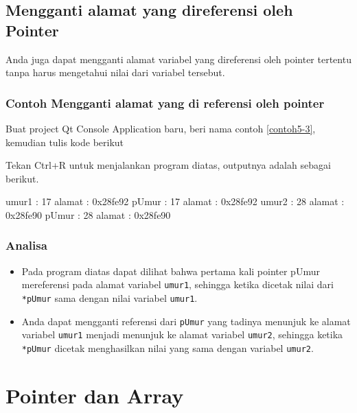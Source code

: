 \subsection{Mengganti alamat yang direferensi oleh
Pointer}\label{mengganti-alamat-yang-direferensi-oleh-pointer}

Anda juga dapat mengganti alamat variabel yang direferensi oleh pointer
tertentu tanpa harus mengetahui nilai dari variabel tersebut.

\subsubsection*{Contoh  Mengganti alamat yang di referensi oleh pointer}

Buat project Qt Console Application baru, beri nama contoh \ref{contoh5-3}, kemudian
tulis kode berikut



Tekan Ctrl+R untuk menjalankan program diatas, outputnya adalah sebagai
berikut.

\begin{lcverbatim}
umur1 : 17 alamat : 0x28fe92
pUmur : 17 alamat : 0x28fe92
umur2 : 28 alamat : 0x28fe90
pUmur : 28 alamat : 0x28fe90
\end{lcverbatim}

\subsubsection*{Analisa}

\begin{itemize}

\item
  Pada program diatas dapat dilihat bahwa pertama kali pointer pUmur
  mereferensi pada alamat variabel \texttt{umur1}, sehingga ketika
  dicetak nilai dari \texttt{*pUmur} sama dengan nilai variabel
  \texttt{umur1}.
\item
  Anda dapat mengganti referensi dari \texttt{pUmur} yang tadinya
  menunjuk ke alamat variabel \texttt{umur1} menjadi menunjuk ke alamat
  variabel \texttt{umur2}, sehingga ketika \texttt{*pUmur} dicetak
  menghasilkan nilai yang sama dengan variabel \texttt{umur2}.
\end{itemize}

\section{Pointer dan Array}\label{pointer-dan-array}

